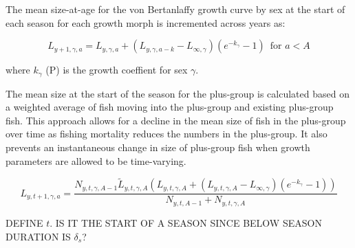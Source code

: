 \documentclass[11pt,
  english,
  letterpaper,
]{article}
\begin{document}
The mean size-at-age for the von Bertanlaffy growth curve by sex at the start of each season for each growth morph is incremented across years as:

\leavevmode\tagmcend\tagstructend\par


\begin{equation}
\label{eqn9}
L_{y+1,\gamma,a} = L_{y,\gamma,a} + (L_{y,\gamma,a-k} - L_{\infty,\gamma}) (e^{-k_{\gamma}} - 1) \;\ \text{for $a<A$}
\end{equation}

\leavevmode\tagmcend\tagstructend\par


where {\(k_{\gamma}\)\leavevmode\tagmcend\tagstructend} (P) is the growth coeffient for sex {\(\gamma\)\leavevmode\tagmcend\tagstructend}.

\leavevmode\tagmcend\tagstructend\par


The mean size at the start of the season for the plus-group is calculated based on a weighted average of fish moving into the plus-group and existing plus-group fish. This approach allows for a decline in the mean size of fish in the plus-group over time as fishing mortality reduces the numbers in the plus-group. It also prevents an instantaneous change in size of plus-group fish when growth parameters are allowed to be time-varying.

\leavevmode\tagmcend\tagstructend\par


\begin{equation}
\label{eqn10}
L_{y,t+1,\gamma,a} = \frac{N_{y,t,\gamma,A-1} \tilde{L}_{y,t,\gamma,A} (L_{y,t,\gamma,A} + (L_{y,t,\gamma,A} - L_{\infty,\gamma}) (e^{-k_{\gamma}} - 1))}{ N_{y,t,A-1} + N_{y,t,\gamma,A} } 
\end{equation}

\leavevmode\tagmcend\tagstructend\par


DEFINE {\(t\)\leavevmode\tagmcend\tagstructend}. IS IT THE START OF A SEASON SINCE BELOW SEASON DURATION IS {\(\delta_s\)\leavevmode\tagmcend\tagstructend}?
\end{document}
